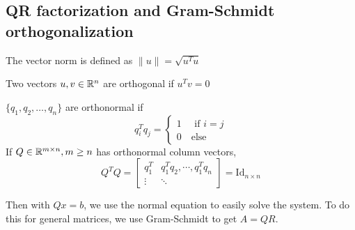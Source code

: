 \documentclass[11pt]{article}
\begin{document}
\subsection{QR factorization and Gram-Schmidt orthogonalization}
\begin{definition}
    The vector norm is defined as $\lVert u\rVert = \sqrt{u^Tu}$
\end{definition}
\begin{definition}
    Two vectors $u, v \in \mathbb{R}^n$ are orthogonal if $u^Tv = 0$
\end{definition}
\begin{definition}
    $\{q_1, q_2, \dots, q_n\}$ are orthonormal if 
    \[
        q_i^T q_j = \begin{cases}
            1 \quad \text{ if } i=j\\
            0 \quad \text{else}
        \end{cases}
    \]
    If $Q \in \mathbb{R}^{m \times n}, m \ge n$ has orthonormal column vectors,
    \[
    Q^TQ = 
    \begin{bmatrix}
         q_1^T & q_1^Tq_2, \cdots, q_1^T q_n\\
         \vdots & \ddots
    \end{bmatrix}
        = \text{Id}_{n\times n}
    \]
\end{definition}
Then with $Qx=b$, we use the normal equation to easily solve the system. To do this for general matrices, we use Gram-Schmidt to get $A= QR$.
\end{document}
